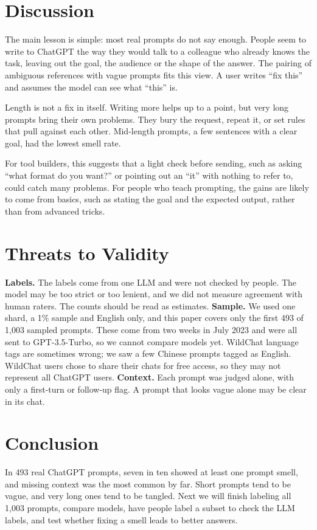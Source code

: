\documentclass[conference]{IEEEtran}
\begin{document}
\section{Discussion}
The main lesson is simple: most real prompts do not say enough. People seem to
write to ChatGPT the way they would talk to a colleague who already knows the
task, leaving out the goal, the audience or the shape of the answer. The pairing
of ambiguous references with vague prompts fits this view. A user writes ``fix
this'' and assumes the model can see what ``this'' is.

Length is not a fix in itself. Writing more helps up to a point, but very long
prompts bring their own problems. They bury the request, repeat it, or set rules
that pull against each other. Mid-length prompts, a few sentences with a clear
goal, had the lowest smell rate.

For tool builders, this suggests that a light check before sending, such as
asking ``what format do you want?'' or pointing out an ``it'' with nothing to
refer to, could catch many problems. For people who teach prompting, the gains
are likely to come from basics, such as stating the goal and the expected output,
rather than from advanced tricks.

\section{Threats to Validity}
\textbf{Labels.} The labels come from one LLM and were not checked by people.
The model may be too strict or too lenient, and we did not measure agreement with
human raters. The counts should be read as estimates.
\textbf{Sample.} We used one shard, a 1\% sample and English only, and this
paper covers only the first 493 of 1,003 sampled prompts. These come from two
weeks in July 2023 and were all sent to GPT-3.5-Turbo, so we cannot compare
models yet. WildChat language tags are sometimes wrong; we saw a few Chinese
prompts tagged as English. WildChat users chose to share their chats for free
access, so they may not represent all ChatGPT users.
\textbf{Context.} Each prompt was judged alone, with only a first-turn or follow-up
flag. A prompt that looks vague alone may be clear in its chat.

\section{Conclusion}
In 493 real ChatGPT prompts, seven in ten showed at least one prompt smell, and
missing context was the most common by far. Short prompts tend to be vague, and
very long ones tend to be tangled. Next we will finish labeling all 1,003 prompts,
compare models, have people label a subset to check the LLM labels, and test
whether fixing a smell leads to better answers.
\end{document}
